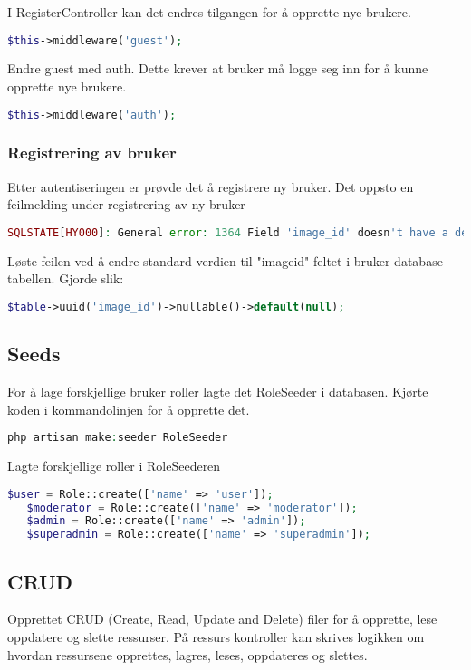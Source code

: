 I RegisterController kan det endres tilgangen for å opprette nye brukere.
\begin{lstlisting}[language=PHP]
    $this->middleware('guest');
\end{lstlisting}
Endre guest med auth. Dette krever at bruker må logge seg inn for å kunne opprette nye brukere.
\begin{lstlisting}[language=PHP]
    $this->middleware('auth');
\end{lstlisting}

\subsubsection{ Registrering av bruker}
Etter autentiseringen er prøvde det å registrere ny bruker. Det oppsto en feilmelding under registrering av ny bruker
\begin{lstlisting}[language=PHP]
    SQLSTATE[HY000]: General error: 1364 Field 'image_id' doesn't have a default value
\end{lstlisting}
Løste feilen ved å endre standard verdien til "imageid" feltet i bruker database tabellen. Gjorde slik:

\begin{lstlisting}[language=PHP]
    $table->uuid('image_id')->nullable()->default(null);
\end{lstlisting}

\subsection{Seeds}
For å lage forskjellige bruker roller lagte det RoleSeeder i databasen.
Kjørte koden i kommandolinjen for å opprette det.
\begin{lstlisting}[language=PHP]
    php artisan make:seeder RoleSeeder
\end{lstlisting}
Lagte forskjellige roller i RoleSeederen
\begin{lstlisting}[language=PHP]
    $user = Role::create(['name' => 'user']);
   $moderator = Role::create(['name' => 'moderator']);
   $admin = Role::create(['name' => 'admin']);
   $superadmin = Role::create(['name' => 'superadmin']);
\end{lstlisting}
\subsection{CRUD}
Opprettet CRUD (Create, Read, Update and Delete) filer for å opprette, lese oppdatere og slette ressurser. På ressurs kontroller kan skrives logikken om hvordan ressursene opprettes, lagres, leses, oppdateres og slettes.


